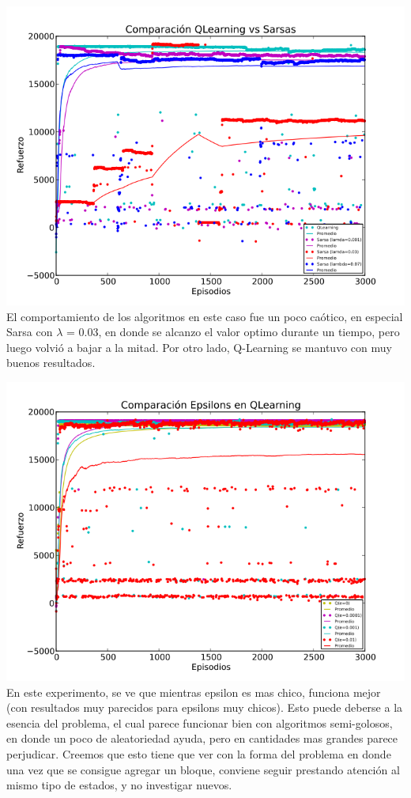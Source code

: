 \documentclass[11pt, a4paper]{article}
\begin{document}
\includegraphics[scale=0.6]{Graficos/QvsS}
El comportamiento de los algoritmos en este caso fue un poco ca\'otico, en especial Sarsa con $\lambda$ = 0.03, en donde se alcanzo el valor optimo durante un tiempo, pero luego volvi\'o a bajar a la mitad. Por otro lado, Q-Learning se mantuvo con muy buenos resultados. 

\includegraphics[scale=0.6]{Graficos/epsilonsQ}
En este experimento, se ve que mientras epsilon es mas chico, funciona mejor (con resultados muy parecidos para epsilons muy chicos). Esto puede deberse a la esencia del problema, el cual parece funcionar bien con algoritmos semi-golosos, en donde un poco de aleatoriedad ayuda, pero en cantidades mas grandes parece perjudicar. Creemos que esto tiene que ver con la forma del problema en donde una vez que se consigue agregar un bloque, conviene seguir prestando atenci\'on al mismo tipo de estados, y no investigar nuevos. 
\end{document}
